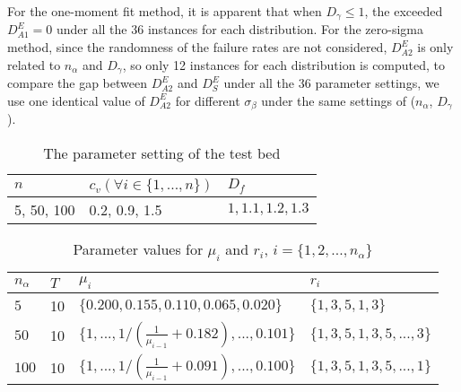 \documentclass[preprint,12pt]{elsarticle}
\begin{document}
For the one-moment fit method, it is apparent that when $D_{\gamma} \leq 1$, the exceeded $D^{E}_{A1} = 0$ under all the 36 instances for each distribution. For the zero-sigma method, since the randomness of the failure rates are not considered, $D^{E}_{A2}$ is only related to $n_{\alpha}$ and $D_{\gamma}$, so only 12 instances for each distribution is computed, to compare the gap between $D^{E}_{A2}$ and $D^{E}_{S}$ under all the 36 parameter settings, we use one identical value of $D^{E}_{A2}$ for different $\sigma_{\beta}$ under the same settings of ($n_{\alpha}$, $D_{\gamma}$).





\begin{table}[htbp]
  \centering
  \caption{The parameter setting of the test bed}
    \begin{tabular}{lll}
    \toprule
  $n$ & $c_{v} (\forall i \in \{1,...,n\})$ & $D_{f}$\\
    \midrule
    5, 50, 100 & 0.2, 0.9, 1.5 & $ 1, 1.1, 1.2, 1.3$ \\
  \bottomrule
    \end{tabular}%
  \label{tab:testbedps}%
\end{table}

\begin{table}[htbp]
  \centering
  \caption{Parameter values for $\mu_{i}$ and $r_{i}$, $i=\{1,2,...,n_{\alpha}\}$}
    \begin{tabular}{llll}
    \toprule
    $n_{\alpha}$ & $T$ & $\mu_{i}$ &  $r_{i}$\\
    \midrule
    $5$   &10& $\{0.200, 0.155, 0.110, 0.065, 0.020\}$ &$\{1,3,5,1,3\}$\\
    $50$  &10& $\{1,...,1/(\frac{1}{\mu_{i-1}}+0.182),...,0.101\}$ &$\{1,3,5,1,3,5,...,3\}$\\
    $100$ &10& $\{1,...,1/(\frac{1}{\mu_{i-1}}+0.091),...,0.100\}$ &$\{1,3,5,1,3,5,...,1\}$\\
    \bottomrule
    \end{tabular}%
  \label{tab:testbedmur}%
\end{table}
\end{document}
